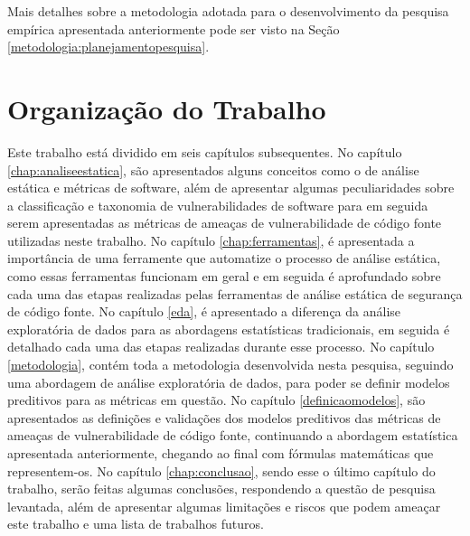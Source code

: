 Mais detalhes sobre a metodologia adotada para o desenvolvimento da pesquisa
empírica apresentada anteriormente pode ser visto na Seção
\ref{metodologia:planejamentopesquisa}.

\section{Organização do Trabalho}

Este trabalho está dividido em seis capítulos subsequentes. No capítulo
\ref{chap:analiseestatica}, são apresentados alguns conceitos como o de análise
estática e métricas de software, além de apresentar algumas peculiaridades sobre
a classificação e taxonomia de vulnerabilidades de software para em seguida
serem apresentadas as métricas de ameaças de vulnerabilidade de código fonte
utilizadas neste trabalho. No capítulo \ref{chap:ferramentas}, é apresentada a
importância de uma ferramente que automatize o processo de análise estática,
como essas ferramentas funcionam em geral e em seguida é aprofundado sobre cada
uma das etapas realizadas pelas ferramentas de análise estática de segurança de
código fonte. No capítulo \ref{eda}, é apresentado a diferença da análise
exploratória de dados para as abordagens estatísticas tradicionais, em seguida é
detalhado cada uma das etapas realizadas durante esse processo. No capítulo
\ref{metodologia}, contém toda a metodologia desenvolvida nesta pesquisa,
seguindo uma abordagem de análise exploratória de dados, para poder se definir
modelos preditivos para as métricas em questão. No capítulo
\ref{definicaomodelos}, são apresentados as definições e validações dos modelos
preditivos das métricas de ameaças de vulnerabilidade de código fonte,
continuando a abordagem estatística apresentada anteriormente, chegando ao final
com fórmulas matemáticas que representem-os. No capítulo \ref{chap:conclusao},
sendo esse o último capítulo do trabalho, serão feitas algumas conclusões,
respondendo a questão de pesquisa levantada, além de apresentar algumas
limitações e riscos que podem ameaçar este trabalho e uma lista de trabalhos
futuros.


